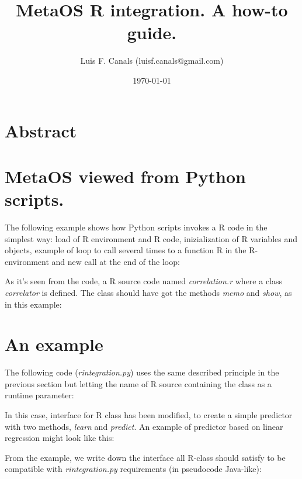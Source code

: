 \documentclass[11pt,a4paper]{article}
\title{MetaOS R integration. A how-to guide.}
\author{Luis F. Canals (luisf.canals@gmail.com)}
\begin{document}
\date{\today}
\maketitle


\section{Abstract}

\section{MetaOS viewed from Python scripts.}

The following example shows how Python scripts invokes a R code in 
the simplest way: load of R environment and R code, inizialization of R
variables and objects, example of loop to call several times to a function
R in the R-environment and new call at the end of the loop:

\lstset{language=Python,frame=single,tabsize=2,basicstyle=\tiny}


As it's seen from the code, a R source code named \emph{correlation.r}
where a class \emph{correlator} is defined. The class should have got the
methods \emph{memo} and \emph{show}, as in this example:

\lstset{language=R,frame=single,tabsize=2,basicstyle=\tiny}




\section{An example}

The following code (\emph{rintegration.py}) uses the same described principle 
in the previous section but letting the name of R source containing the 
class as a runtime parameter:

\lstset{language=Python,frame=single,tabsize=2,basicstyle=\tiny}


In this case, interface for R class has been modified, to create a simple
predictor with two methods, \emph{learn} and \emph{predict}. An example of
predictor based on linear regression might look like this:

From the example, we write down the interface all R-class should satisfy
to be compatible with \emph{rintegration.py} requirements (in pseudocode 
Java-like):
\end{document}
